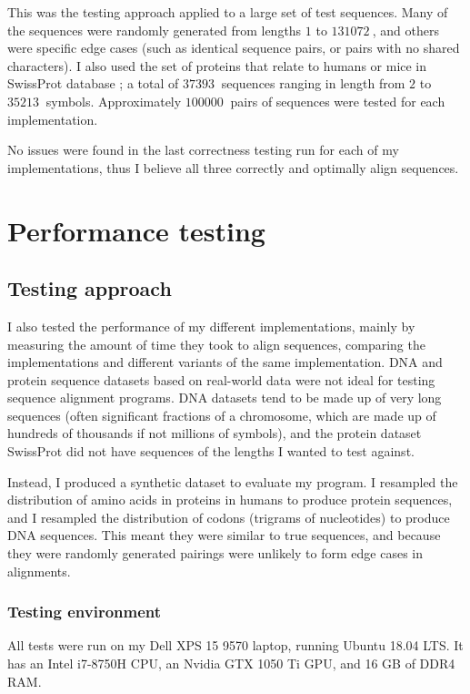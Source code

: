This was the testing approach applied to a large set of test sequences. Many of the sequences were randomly generated from lengths $1$ to $\SI{131072}{}$, and others were specific edge cases (such as identical sequence pairs, or pairs with no shared characters).
I also used the set of proteins that relate to humans or mice in SwissProt database \cite{UniProt}; a total of $\SI{37393}{}$ sequences ranging in length from $2$ to $\SI{35213}{}$ symbols. Approximately $\SI{100000}{}$ pairs of sequences were tested for each implementation.

No issues were found in the last correctness testing run for each of my implementations, thus I believe all three correctly and optimally align sequences.

\section{Performance testing}
\label{sec:Performance_eval}

\subsection{Testing approach}
\label{sec:Performance_approach}

I also tested the performance of my different implementations, mainly by measuring the amount of time they took to align sequences, comparing the implementations and different variants of the same implementation.
DNA and protein sequence datasets based on real-world data were not ideal for testing sequence alignment programs.
DNA datasets tend to be made up of very long sequences (often significant fractions of a chromosome, which are made up of hundreds of thousands if not millions of symbols), and the protein dataset SwissProt \cite{UniProt} did not have sequences of the lengths I wanted to test against.

Instead, I produced a synthetic dataset to evaluate my program.
I resampled the distribution of amino acids in proteins in humans \cite{AminoAcidFreqs} to produce protein sequences, and I resampled the distribution of codons (trigrams of nucleotides) \cite{CodonFreqs} to produce DNA sequences.
This meant they were similar to true sequences, and because they were randomly generated pairings were unlikely to form edge cases in alignments.

\subsubsection{Testing environment}
\label{sec:Testing_environment}
All tests were run on my Dell XPS 15 9570 laptop, running Ubuntu 18.04 LTS.
It has an Intel i7-8750H CPU, an Nvidia GTX 1050 Ti GPU, and 16 GB of DDR4 RAM.


